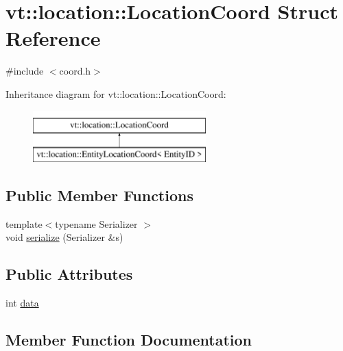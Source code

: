 \hypertarget{structvt_1_1location_1_1_location_coord}{}\section{vt\+:\+:location\+:\+:Location\+Coord Struct Reference}
\label{structvt_1_1location_1_1_location_coord}


{\ttfamily \#include $<$coord.\+h$>$}

Inheritance diagram for vt\+:\+:location\+:\+:Location\+Coord\+:\begin{figure}[H]
\begin{center}
\leavevmode
\includegraphics[height=2.000000cm]{structvt_1_1location_1_1_location_coord}
\end{center}
\end{figure}
\subsection*{Public Member Functions}
\begin{DoxyCompactItemize}
\item 
{\footnotesize template$<$typename Serializer $>$ }\\void \hyperlink{structvt_1_1location_1_1_location_coord_a753861168e43ce015323fba60f45faf7}{serialize} (Serializer \&s)
\end{DoxyCompactItemize}
\subsection*{Public Attributes}
\begin{DoxyCompactItemize}
\item 
int \hyperlink{structvt_1_1location_1_1_location_coord_aa94c83bab2f01365b14852e7b80e6aec}{data}
\end{DoxyCompactItemize}


\subsection{Member Function Documentation}
\mbox{\label{structvt_1_1location_1_1_location_coord_a753861168e43ce015323fba60f45faf7}} 
